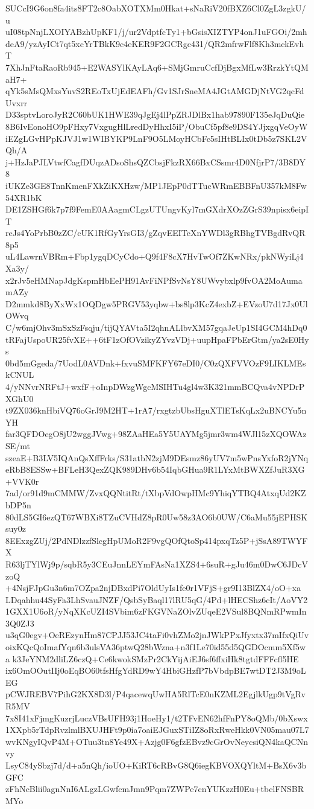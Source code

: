 SUCcI9G6on8fa4its8FT2c8OabXOTXMm0Hkat+sNaRiV20fBXZ6Cl0ZgL3zgkU/u
uI08tpNnjLXOIYABzhUpKF1/j/ur2VdptfcTy1+bGsisXIZTYP4onJ1uFGOi/2mh
deA9/yzAyICt7qt5xcYrTBkK9c4eKER9F2GCRgc431/QR2mfrwFlf8Kh3mckEvhT
7XhJnFtaRaoRb945+E2WASYlKAyLAq6+SMjGmruCcfDjBgxMfLw3RrzkYtQMaH7+
qYk5sMsQMxsYuvS2REoTxUjEdEAFh/Gv1SJrSneMA4JGtAMGDjNtVG2qcFdUvxrr
D33sptvLoroJyR2C60bUK1HWE39qJgEj4lPpZRJDlBx1hab97890F135eJqDuQie
8B6IvEonoHO9pFHxy7VxgugHlLredDyHhxI5iP/ObuCf5pf8e9DS4YJjxgqVeOyW
iEZgLGvHPpKJVJ1w1WIBYKP9LnF9O5LMoyHCbFc5sIHtBLIx0tDb5z7SKL2VQh/A
j+HzJaPJLVtwfCagfDUqzADsoShsQZCbsjFkzRX66BxCSsmr4D0NfjrP7/3B8DY8
iUKZe3GE8TnnKmenFXkZiKXHzw/MP1JEpP0dTTucWRmEBBFnU357kM8Fw54XR1bK
DE1ZSHGf6k7p7f9FemE0AAagmCLgzUTUngvKyl7mGXdrXOzZGrS39npisx6eipIT
reJs4YoPrbB0zZC/cUK1RfGyYrsGI3/gZqvEEITeXnYWDl3gRBhgTVBgdRvQR8p5
uL4LawrnVBRm+Fbp1ygqDCyCdo+Q9f4F8cX7HvTwOf7ZKwNRx/pkNWyiLj4Xa3y/
x2rJv5eHMNapJdgKspmHbEePH91AvFiNPfSvNsY8UWvybxlp9fvOA2MoAumamAZy
D2mmkd8ByXxWx1OQDgw5PRGV53yqbw+bs8lp3KcZ4exbZ+EVzoU7d17Jx0UlOWvq
C/w6mjOhv3mSxSzFsqju/tijQYAVta5I2qhnALlbvXM57gqaJeUp1SI4GCM4hDq0
tRFajUspoUR25fvXE++6tF1zOfOVzikyZYvzVDj+uupHpaFPbErGtm/ya2sE0Hys
0bd5mGgeda/7UodL0AVDnk+fxvuSMFKFY67eDI0/C0zQXFVVOzF9LIKLMEskCNUL
4/yNNvrNRFtJ+wxfF+oInpDWzgWgcMSIHTu4gl4w3K321mmBCQva4vNPDrPXGhU0
t9ZX036knHbiVQ76oGrJ9M2HT+1rA7/rxgtzbUbsHguXTlETsKqLx2uBNCYu5nYH
far3QFDOegO8jU2wggJVwg+98ZAaHEa5Y5UAYMg5jmr3wm4WJl15zXQOWAzSE/mt
szeaE+B3LV5IQAnQsXffFrks/S31atbN2zjM9DEsmz86yUV7m5wPnsYxfoR2jYNq
eRbB8ESSw+BFLeH3QexZQK989DHv6b54IqbGHua9R1LYxMtBWXZfJuR3XG+VVK0r
7ad/or91d9mCMMW/ZvxQQNtitRt/tXbpVdOwpHMc9YhiqYTBQ4AtxqUd2KZbDP5n
80dLS5GI6ezQT67WBXi8TZuCVHdZ8pR0Uw58z3AO6b0UW/C6aMu55jEPHSKsuy0z
8EExzgZUj/2PdNDlzzfSlcgHpUMoR2F9vgQOfQtoSp414pxqTz5P+jSsA89TWYFX
R63ljTYlWj9p/sqbR5y3CEuJnnLEYmFAsNa1XZS4+6suR+gJu46m0DwC6JDcVzoQ
+4NsjFJpGu3n6m7OZpa2njDBxdPi7OldUyIs1fe0r1VFjS+gr9I13BlZX4/oO+xa
LDqahhu44SyFa3LhSvauJNZF/QsbSyBaql17lRU5qG/4Pd+lHECShz6cIt/AoVY2
1GXX1U6oR/yNqXKcUZI4SVbim6zFKGVNaZOlvZUqeE2VSul8BQNmRPwmIn3Q0ZJ3
u3qG0egv+OeREzynHm87CPJJ53JC4taFi0vhZMo2jnJWkPPxJfyxtx37mIfxQiUv
oixKQcQoImafYqn6b3ulsVA36ptwQ28bWzna+n3f1Le70id55d5QGDOcmm5Xf5wa
k3JeYNM2dliLZ6czQ+Ce6kwokSMzPr2CkYijAiEJ6sf6ffxiHk8tgtdFFFcfl5HE
ix6OmOOutIIj0oEqBO60tfsHfgYdRD9wY4HbiGHzfP7bVbdpBE7wtDT2J3M9oLEG
pCWJREBV7PihG2KX8D3l/P4qacewqUwHA5RlTcE0nKZML2EgjlkUgp9tVgRvR5MV
7x8I41xFjmgKuzrjLuczVBsUFH93j1HoeHy1/t2TFvEN62hfFnPY8oQMb/0bXswx
1XXpb5rTdpRvzlmlBXUJHFt9p0ia7oaiEJGuxSTiIZ8oRxRweHkk0VN05mau07L7
wvKNgyIQvP4M+OTuu3tn8Ye49X+Azjg0F6gfzEBvz9cGrOvNeycsiQN4kaQCNnvy
LsyC84ySbzj7d/d+a5nQh/ioUO+KiRT6cRBvG8Q6iegKBVOXQYltM+BsX6v3bGFC
zFhNcBlii0agnNnI6ALgzLGwfcmJmn9Pqm7ZWPe7cnYUKzzH0Eu+tbclFNSBRMYo
